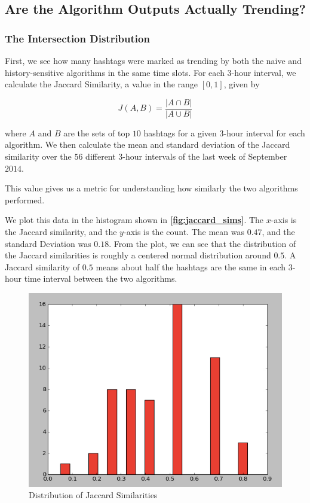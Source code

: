 \documentclass[twoside]{article}
\newcommand{\aref}[1]
 {\textbf{\autoref{#1}}}
\begin{document}
{\subsection{Are the Algorithm Outputs Actually Trending?}

\subsubsection{The Intersection Distribution}

First, we see how many hashtags were marked as trending 
by both the naive and history-sensitive algorithms in the same time slots.
For each $3$-hour interval, we calculate the Jaccard Similarity, a value
in the range $[0, 1]$, given by 

\begin{equation}
\label{eq:jaccard}
J(A, B) = \frac{|A \cap B|}{|A \cup B|}
\end{equation}

\noindent where $A$ and $B$ are the sets of top $10$ hashtags for a given $3$-hour interval
for each algorithm. 
We then calculate the mean and standard deviation of the Jaccard similarity
over the $56$ different $3$-hour intervals of the last week of September $2014$.

This value gives us a metric for understanding how similarly the two algorithms performed.

We plot this data in the histogram shown in \aref{fig:jaccard_sims}. The $x$-axis is the Jaccard similarity, and the $y$-axis is the count. The mean was $0.47$, and the standard Deviation was $0.18$. From the plot, we can see that the distribution of the Jaccard similarities is roughly a centered normal distribution around $0.5$. A Jaccard similarity of $0.5$ means about half the hashtags are the same in each $3$-hour time interval between the two algorithms. 

\begin{figure}
\centering
\includegraphics[scale = .4]{jaccard_sims}
\caption{Distribution of Jaccard Similarities}
\label{fig:jaccard_sims}
\end{figure}

}
\end{document}
